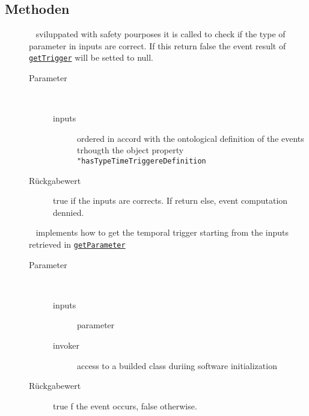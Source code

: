 \subsection{Methoden}
\begin{description}
\item[{\label{ontologyFramework.OFEventManagement.OFTimeTriggerManagement.OFTimeTriggerInterface.isCorrectInput(java.util.List<ontologyFramework.OFEventManagement.EventComputedData>)}}]
~ sviluppated with safety pourposes it is called to check
 if the type of parameter in inputs are correct. If this return
 false the event result of \texttt{\hyperlink{ontologyFramework.OFEventManagement.OFTimeTriggerManagement.OFTimeTriggerInterface.getTrigger(java.util.List<ontologyFramework.OFEventManagement.EventComputedData>,ontologyFramework.OFRunning.OFInvokingManager.OFBuildedListInvoker)}{getTrigger}}
 will be setted to null.
\begin{description}
\item[Parameter] ~
\begin{description}
\item[inputs]
ordered in accord with the ontological definition of the events trhougth the
 object property \verb!"hasTypeTimeTriggereDefinition!
\end{description}
\item[Rückgabewert] 
true if the inputs are corrects. If return else, event computation dennied.
\end{description}
\item[{\label{ontologyFramework.OFEventManagement.OFTimeTriggerManagement.OFTimeTriggerInterface.getTrigger(java.util.List<ontologyFramework.OFEventManagement.EventComputedData>,ontologyFramework.OFRunning.OFInvokingManager.OFBuildedListInvoker)}}]
~ implements how to get the temporal trigger starting from the inputs retrieved in
 \texttt{\hyperlink{ontologyFramework.OFEventManagement.OFEventParameterDefinition.getParameter()}{getParameter}}
\begin{description}
\item[Parameter] ~
\begin{description}
\item[inputs]
parameter
\item[invoker]
access to a builded class duriing software initialization
\end{description}
\item[Rückgabewert] 
true f the event occurs, false otherwise.
\end{description}
\end{description}
